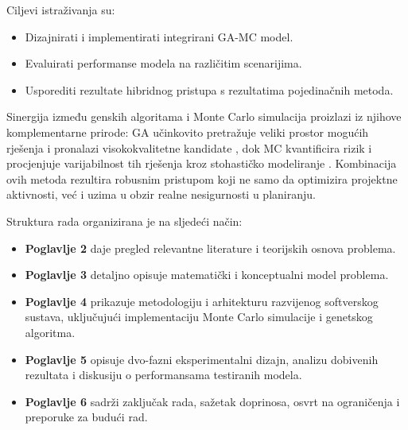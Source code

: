 Ciljevi istraživanja su:
\begin{itemize}
    \item Dizajnirati i implementirati integrirani GA-MC model.
    \item Evaluirati performanse modela na različitim scenarijima.
    \item Usporediti rezultate hibridnog pristupa s rezultatima pojedinačnih metoda.
\end{itemize}

Sinergija između genskih algoritama i Monte Carlo simulacija proizlazi iz njihove komplementarne prirode: GA učinkovito pretražuje veliki prostor mogućih rješenja i pronalazi visokokvalitetne kandidate \cite{Goldberg1989}, dok MC kvantificira rizik i procjenjuje varijabilnost tih rješenja kroz stohastičko modeliranje \cite{Rubinstein2016}. Kombinacija ovih metoda rezultira robusnim pristupom koji ne samo da optimizira projektne aktivnosti, već i uzima u obzir realne nesigurnosti u planiranju.

Struktura rada organizirana je na sljedeći način:
\begin{itemize}
    \item \textbf{Poglavlje 2} daje pregled relevantne literature i teorijskih osnova problema.
    \item \textbf{Poglavlje 3} detaljno opisuje matematički i konceptualni model problema.   
    \item \textbf{Poglavlje 4} prikazuje metodologiju i arhitekturu razvijenog softverskog sustava, uključujući implementaciju Monte Carlo simulacije i genetskog algoritma.   
    \item \textbf{Poglavlje 5} opisuje dvo-fazni eksperimentalni dizajn, analizu dobivenih rezultata i diskusiju o performansama testiranih modela.   
    \item \textbf{Poglavlje 6} sadrži zaključak rada, sažetak doprinosa, osvrt na ograničenja i preporuke za budući rad.
    \end{itemize}


